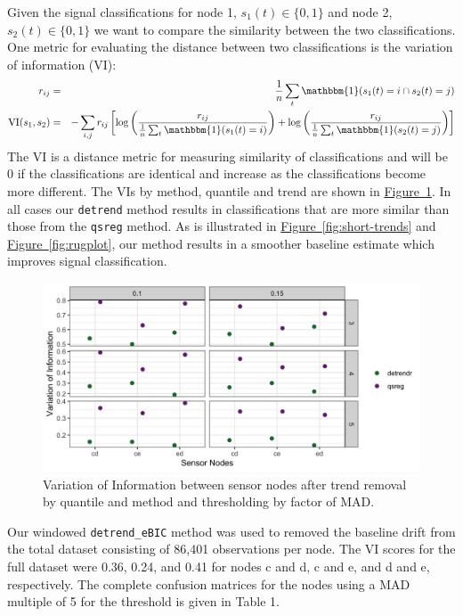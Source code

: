 \documentclass[12pt]{article}
\newcommand{\Fig}[1]{\hyperref[fig:#1]{Figure~\ref*{fig:#1}}} %
\newcommand{\Fig}[1]{{Figure~\ref{fig:#1}}} %
\newcommand{\VI}{\text{VI}}
\newcommand{\One}{\mathbbm{1}}
\begin{document}
	Given the signal classifications for node 1, $s_1(t) \in \{0,1\}$ and node 2, $s_2(t)\in\{0,1\}$ we want to compare the similarity between the two classifications. One metric for evaluating the distance between two classifications is the variation of information (VI): 
	\begin{eqnarray*}
		r_{ij} & = & \frac{1}{n}\sum_t \One(s_1(t) = i  \cap s_2(t) = j)\\
		\VI(s_1, s_2) & = & -\sum_{i,j} r_{ij} \left[ \log \left(\frac{r_{ij}}{\frac{1}{n}\sum_t \One(s_1(t) = i)}\right) + 
		\log \left(\frac{r_{ij}}{\frac{1}{n}\sum_t \One(s_2(t) = j)}\right) \right]
	\end{eqnarray*}	
	The $\VI$ is a distance metric for measuring similarity of classifications and will be 0 if the classifications are identical and increase as the classifications become more different. The VIs by method, quantile and trend are shown in \Fig{vi}. In all cases our \texttt{detrend} method results in classifications that are more similar than those from the \texttt{qsreg} method. As is illustrated in \Fig{short-trends} and \Fig{rugplot}, our method results in a smoother baseline estimate which improves signal classification. 
		
	\begin{figure}
		\centering
		\includegraphics[width = .9\linewidth]{Figures/VI_app_short.png}
		\caption{Variation of Information between sensor nodes after trend removal by quantile and method and thresholding by factor of MAD.}		
		\label{fig:vi}
	\end{figure}
	
	Our windowed \texttt{detrend\_eBIC} method was used to removed the baseline drift from the total dataset consisting of 86,401 observations per node. The VI scores for the full dataset were 0.36, 0.24, and 0.41 for nodes c and d, c and e, and d and e, respectively. The complete confusion matrices for the nodes using a MAD multiple of 5 for the threshold is given in Table 1. 
		
\end{document}
